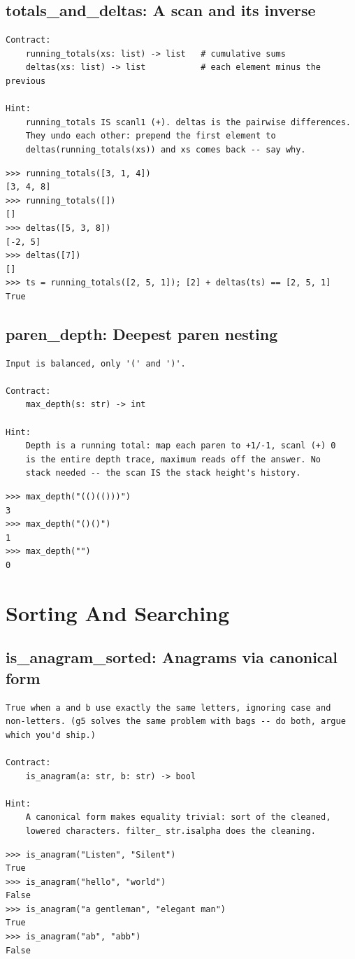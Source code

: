 \documentclass[10pt,letterpaper]{book}
\begin{document}
\section{totals\_and\_deltas: A scan and its inverse}
\begin{lstlisting}[style=ex]
Contract:
    running_totals(xs: list) -> list   # cumulative sums
    deltas(xs: list) -> list           # each element minus the previous

Hint:
    running_totals IS scanl1 (+). deltas is the pairwise differences.
    They undo each other: prepend the first element to
    deltas(running_totals(xs)) and xs comes back -- say why.
\end{lstlisting}
\begin{lstlisting}[style=ex]
>>> running_totals([3, 1, 4])
[3, 4, 8]
>>> running_totals([])
[]
>>> deltas([5, 3, 8])
[-2, 5]
>>> deltas([7])
[]
>>> ts = running_totals([2, 5, 1]); [2] + deltas(ts) == [2, 5, 1]
True
\end{lstlisting}

\section{paren\_depth: Deepest paren nesting}
\begin{lstlisting}[style=ex]
Input is balanced, only '(' and ')'.

Contract:
    max_depth(s: str) -> int

Hint:
    Depth is a running total: map each paren to +1/-1, scanl (+) 0
    is the entire depth trace, maximum reads off the answer. No
    stack needed -- the scan IS the stack height's history.
\end{lstlisting}
\begin{lstlisting}[style=ex]
>>> max_depth("(()(()))")
3
>>> max_depth("()()")
1
>>> max_depth("")
0
\end{lstlisting}
\chapter{Sorting And Searching}

\section{is\_anagram\_sorted: Anagrams via canonical form}
\begin{lstlisting}[style=ex]
True when a and b use exactly the same letters, ignoring case and
non-letters. (g5 solves the same problem with bags -- do both, argue
which you'd ship.)

Contract:
    is_anagram(a: str, b: str) -> bool

Hint:
    A canonical form makes equality trivial: sort of the cleaned,
    lowered characters. filter_ str.isalpha does the cleaning.
\end{lstlisting}
\begin{lstlisting}[style=ex]
>>> is_anagram("Listen", "Silent")
True
>>> is_anagram("hello", "world")
False
>>> is_anagram("a gentleman", "elegant man")
True
>>> is_anagram("ab", "abb")
False
\end{lstlisting}
\end{document}
